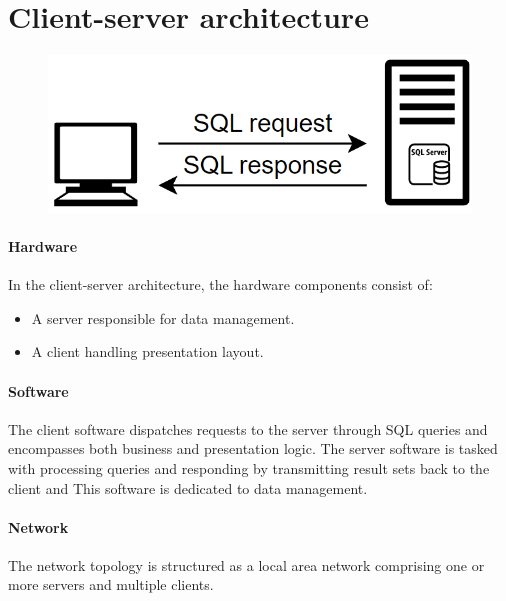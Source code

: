 \section{Client-server architecture}

\begin{figure}[H]
    \centering
    \includegraphics[width=0.25\linewidth]{images/cs.png}
\end{figure}

\paragraph*{Hardware}
In the client-server architecture, the hardware components consist of:
\begin{itemize}
    \item A server responsible for data management.
    \item A client handling presentation layout.
\end{itemize}

\paragraph*{Software}
The client software dispatches requests to the server through SQL queries and encompasses both business and presentation logic.
The server software is tasked with processing queries and responding by transmitting result sets back to the client and 
This software is dedicated to data management.

\paragraph*{Network}
The network topology is structured as a local area network comprising one or more servers and multiple clients.